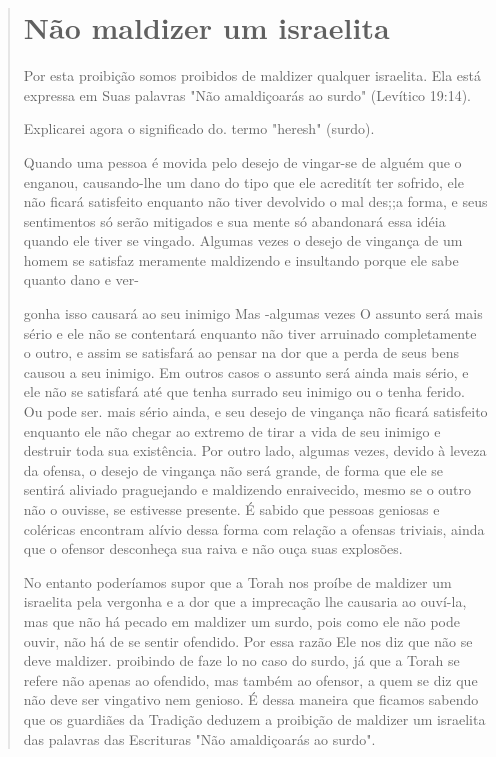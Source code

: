 \begin{quote}
\section{Não maldizer um israelita}

Por esta proibição somos proibidos de maldizer qualquer israelita. Ela
está expressa em Suas palavras "Não amaldiçoarás ao surdo" (Levítico
19:14).

Explicarei agora o significado do. termo "heresh" (surdo).

Quando uma pessoa é movida pelo desejo de vingar-se de alguém que o
enganou, causando-lhe um dano do tipo que ele acreditít ter sofrido, ele
não ficará satisfeito enquanto não tiver devolvido o mal des;;a forma, e
seus sentimentos só serão mitigados e sua mente só abandonará essa idéia
quando ele tiver se vingado. Algumas vezes o desejo de vingança de um
homem se sa­tisfaz meramente maldizendo e insultando porque ele sabe
quanto dano e ver-


gonha isso causará ao seu inimigo Mas -algumas vezes O assunto será mais
sério e ele não se contentará enquanto não tiver arruinado completamente
o outro, e assim se satisfará ao pensar na dor que a perda de seus bens
causou a seu inimigo. Em outros casos o assunto será ainda mais sério, e
ele não se satisfará até que tenha surrado seu inimigo ou o tenha
ferido. Ou pode ser. mais sério ainda, e seu desejo de
vingança não ficará satisfeito enquanto ele não chegar ao extremo de
tirar a vida de seu inimigo e destruir toda sua existência. Por outro
lado, algumas vezes, devido à leveza da ofensa, o desejo de vingança não
será grande, de forma que ele se sentirá aliviado praguejando e
maldizendo enraivecido, mesmo se o outro não o ouvisse, se estivesse
pre­sente. É sabido que pessoas geniosas e coléricas encontram alívio
dessa forma com relação a ofensas triviais, ainda que o ofensor
desconheça sua raiva e não ouça suas explosões.

No entanto poderíamos supor que a Torah nos proíbe de maldizer um
israelita pela vergonha e a dor que a imprecação lhe causaria ao
ouví-la, mas que não há pecado em maldizer um surdo, pois como ele não
pode ouvir, não há de se sentir ofendido. Por essa razão Ele nos diz que
não se deve maldi­zer. proibindo de faze lo no caso do surdo, já que a
Torah se refere não apenas ao ofendido, mas também ao ofensor, a quem se
diz que não deve ser vingati­vo nem genioso. É dessa maneira que ficamos
sabendo que os guardiães da Tra­dição deduzem a proibição de maldizer um
israelita das palavras das Escrituras "Não amaldiçoarás ao surdo".


\end{quote}
